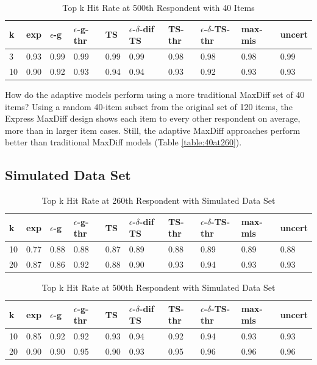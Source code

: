 \documentclass[a4paper,11pt]{article}
\newcommand{\fixedexpressS}{\textbf{exp}}
\newcommand{\egreedyS}{$\epsilon$-\textbf{g}}
\newcommand{\egreedythresS}{$\epsilon$-\textbf{g-thr}}
\newcommand{\misminS}{\textbf{max-mis}}
\newcommand{\tsS}{\textbf{TS} }
\newcommand{\edtsS}{$\epsilon$-$\delta$-\textbf{dif TS} }
\newcommand{\tsthresS}{\textbf{TS-thr} }
\newcommand{\edtsthresS}{$\epsilon$-$\delta$-\textbf{TS-thr} }
\newcommand{\uncertS}{\textbf{uncert} }
\begin{document}
\begin{table}
\caption{Top k Hit Rate at 500th Respondent with 40 Items}
\begin{center}
\begin{tabular}{llllllllll}
\hline   k &  \fixedexpressS & \egreedyS&\egreedythresS&\tsS&\edtsS&\tsthresS&\edtsthresS& \misminS& \uncertS \\ \hline    
3 & 0.93 & 0.99 & 0.99 & 0.99 & 0.99 & 0.98 & 0.98 & 0.98 &  0.99 \\  10 & 0.90 &   0.92 &  0.93  & 0.94 & 0.94 & 0.93 &    0.92 & 0.93 &  0.93 \end{tabular}
\end{center}
\label{table:40at500}
\end{table}
How do the adaptive models perform using a more traditional MaxDiff set of 40 items? Using a random 40-item subset from the original set of 120 items, the Express MaxDiff design shows each item to every other respondent on average, more than in larger item cases. Still, the adaptive MaxDiff approaches perform better than traditional MaxDiff models (Table \ref{table:40at260}).


\subsection{Simulated Data Set}
\begin{table}
\caption{Top k Hit Rate at 260th Respondent with Simulated Data Set}
\begin{center}
\begin{tabular}{llllllllll}
\hline   k &  \fixedexpressS & \egreedyS&\egreedythresS&\tsS&\edtsS&\tsthresS&\edtsthresS& \misminS& \uncertS \\\hline  10 & 0.77 &   0.88 & 0.88  & 0.87&0.89 & 	0.88&0.89 & 0.89 &  0.88 \\  20 &  0.87 &  0.86 &   0.92  & 0.88&0.90 &  	0.93&0.94&  0.93 &  0.93 \end{tabular}
\end{center}
\label{table:nice260}
\end{table}

\begin{table}
\caption{Top k Hit Rate at 500th Respondent with Simulated Data Set}
\begin{center}
\begin{tabular}{llllllllll}
\hline   k &  \fixedexpressS & \egreedyS&\egreedythresS&\tsS&\edtsS&\tsthresS&\edtsthresS& \misminS& \uncertS  \\\hline    10 & 0.85&0.92&0.92 & 0.93&0.94 & 0.92&0.94&0.93 &   0.93 \\  20 & 0.90&0.90&0.95& 0.90 &0.93 & 0.95&0.96 &0.96& 0.96 
\end{tabular}
\end{center}
\label{table:nice500}
\end{table}
\end{document}
